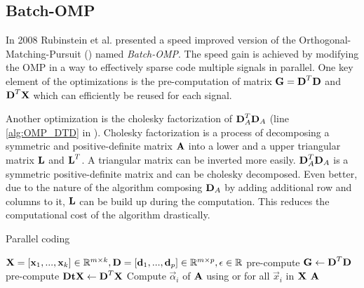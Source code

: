 \subsection{Batch-OMP}
In 2008 Rubinstein et al.\cite{Rubinstein2008} presented a speed improved
version of the Orthogonal-Matching-Pursuit () named
\emph{Batch-OMP}. The speed gain is achieved by modifying the OMP in a way to
effectively sparse code multiple signals in parallel. One key element of the
optimizations is the pre-computation of matrix $\boldsymbol{\mathrm{G}}=\boldsymbol{\mathrm{D}}^T\boldsymbol{\mathrm{D}}$ and
$\boldsymbol{\mathrm{D}}^T\boldsymbol{\mathrm{X}}$ which can efficiently be reused for each signal. 

Another optimization is the cholesky factorization of $\boldsymbol{\mathrm{D}}_A^T \boldsymbol{\mathrm{D}}_A$
(line \ref{alg:OMP_DTD} in ). Cholesky factorization is a
process of decomposing a symmetric and positive-definite matrix $\boldsymbol{\mathrm{A}}$ into
a lower and a upper triangular matrix $\boldsymbol{\mathrm{L}}$ and $\boldsymbol{\mathrm{L}}^T$. A triangular
matrix can be inverted more easily. 
$\boldsymbol{\mathrm{D}}_A^T \boldsymbol{\mathrm{D}}_A$ is a symmetric positive-definite matrix and can be
cholesky decomposed. Even better, due to the nature of the
algorithm composing $\boldsymbol{\mathrm{D}}_A$ by adding additional row and columns to it,
$\boldsymbol{\mathrm{L}}$ can be build up during the computation. This reduces the computational
cost of the algorithm drastically.

\begin{algorithm}[h]
\caption{Parallel coding}
\label{alg:parallel}
\begin{algorithmic}[1]
\REQUIRE $\boldsymbol{\mathrm{X}} =[\boldsymbol{\mathrm{x}}_1,...,\boldsymbol{\mathrm{x}}_k]  \in \mathbb{R}^{m \times k},
\boldsymbol{\mathrm{D}} =[\boldsymbol{\mathrm{d}}_1,...,\boldsymbol{\mathrm{d}}_p] \in
\mathbb{R}^{m\times p}, \epsilon \in \mathbb{R}$
\STATE pre-compute $\boldsymbol{\mathrm{G}} \gets \boldsymbol{\mathrm{D}}^T\boldsymbol{\mathrm{D}}$
\STATE pre-compute $\boldsymbol{\mathrm{DtX}} \gets \boldsymbol{\mathrm{D}}^T\boldsymbol{\mathrm{X}}$
\STATE Compute $\vec{\alpha}_i$ of $\boldsymbol{\mathrm{A}}$ using  or
 for all $\vec{x}_i$ in $\boldsymbol{\mathrm{X}}$
\ENDFOR
\RETURN $\boldsymbol{\mathrm{A}}$
\end{algorithmic}
\end{algorithm}

